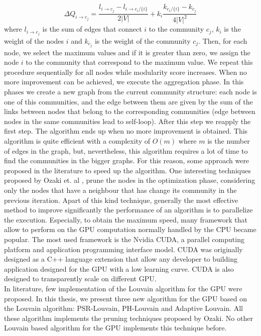 \begin{equation}\label{intro_Delta}
\Delta Q_{i \rightarrow c_j} = \frac{l_{i\rightarrow c_j} - l_{i\rightarrow c_i / \{i\}}}{2|V|} + k_i \frac{k_{c_i / \{i\}} - k_{c_j}}{4|V|^2}
\end{equation}
where $l_{i\rightarrow c_j}$ is the sum of edges that connect $i$ to the community $c_j$, $k_i$ is the weight of the nodes $i$ and $k_{c_j}$ is the weight of the community $c_j$. Then, for each node, we select the maximum values and if it is greater than zero, we assign the node $i$ to the community that correspond to the maximum value. We repeat this procedure sequentially for all nodes while modularity score increases. When no more improvement can be achieved, we execute the aggregation phase. In this phases we create a new graph from the current community structure: each node is one of this communities, and the edge between them are given by the sum of the links between nodes that belong to the corresponding communities (edge between nodes in the same communities lead to self-loop). After this step we reapply the first step. The algorithm ends up when no more improvement is obtained.
This algorithm is quite efficient with a complexity of $O(m)$ where $m$ is the number of edges in the graph, but, nevertheless, this algorithm requires a lot of time to find the communities in the bigger graphs. For this reason, some approach were proposed in the literature to speed up the algorithm. One interesting techniques proposed by Ozaki et. al \cite{pruning}, prune the nodes in the optimization phase, considering only the nodes that have a neighbour that has change its community in the previous iteration. Apart of this kind technique, generally the most effective method to improve significantly the performance of an algorithm is to parallelize the execution. Especially, to obtain the maximum speed, many framework that allow to perform on the GPU computation normally handled by the CPU became popular. The most used framework is the Nvidia CUDA, a parallel computing platform and application programming interface model. CUDA was originally designed as a C++ language extension that allow any developer to building application designed for the GPU with a low learning curve. CUDA is also designed to transparently scale on different GPU.\\
In literature, few implementation of the Louvain algorithm for the GPU were proposed. In this thesis, we present three new algorithm for the GPU based on the Louvain algorithm: PSR-Louvain, PH-Louvain and Adaptive Louvain. All these algorithm implements the pruning techniques proposed by Ozaki. No other Louvain based algorithm for the GPU implements this technique before. 
